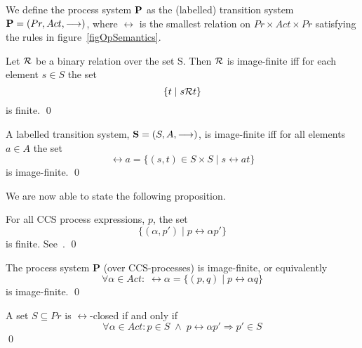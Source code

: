 We define the process system $\hbox{\bf P}$ as the (labelled) transition system $\hbox{\bf P} = (Pr, Act, \stackrel{}{\longrightarrow})$, where $\rel{}$ is the smallest relation on $Pr\times Act\times Pr$ satisfying the rules in figure~\ref{figOpSemantics}.

\begin{definition}
Let $\cal R$ be a binary relation over the set S. Then $\cal R$ is image-finite iff for each element $s\in S$ the set
\[
\{t\mid s{\cal R}t\}
\]
is finite.
\qed
\end{definition}

\begin{definition}
A labelled transition system, $\hbox{\bf S} = (S, A, \longrightarrow)$, is image-finite iff for all elements $a\in A$ the set
\[
\rel{a} = \{(s,t)\in S\times S\mid s\rel{a}t\}
\]
is image-finite.
\qed
\end{definition}

\noindent
We are now able to state the following proposition.

\begin{proposition}\label{propCCSfinite}
For all CCS process expressions, $p$, the set
\[
\{(\alpha,p')\mid p\rel{\alpha}p'\}
\]
is finite.
\proof See~\cite{Larsen}.
\qed
\end{proposition}

\begin{corollary}\label{corImageFinite}
The process system {\bf P} (over CCS-processes) is image-finite, or equivalently
\[
\forall\alpha\in Act:\; \rel{\alpha} = \{(p,q)\mid p\rel{\alpha}q\}
\]
is image-finite.
\qed
\end{corollary}

\begin{definition}
A set $S\subseteq Pr$ is $\rel{}$-closed if and only if
\[
\forall\alpha\in Act: p\in S \;\wedge\; p\rel{\alpha}p' \Rightarrow p'\in S
\]
\qed
\end{definition}

